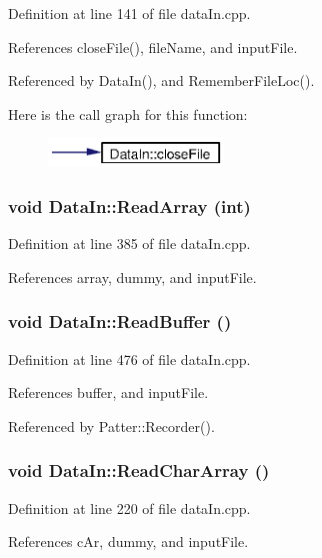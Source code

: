 Definition at line 141 of file data\-In.cpp.

References close\-File(), file\-Name, and input\-File.

Referenced by Data\-In(), and Remember\-File\-Loc().

Here is the call graph for this function:\begin{figure}[H]
\begin{center}
\leavevmode
\includegraphics[width=132pt]{classDataIn_a18_cgraph}
\end{center}
\end{figure}
\subsubsection{\setlength{\rightskip}{0pt plus 5cm}void Data\-In::Read\-Array (int)}\label{classDataIn_a15}




Definition at line 385 of file data\-In.cpp.

References array, dummy, and input\-File.
\subsubsection{\setlength{\rightskip}{0pt plus 5cm}void Data\-In::Read\-Buffer ()}\label{classDataIn_a24}




Definition at line 476 of file data\-In.cpp.

References buffer, and input\-File.

Referenced by Patter::Recorder().
\subsubsection{\setlength{\rightskip}{0pt plus 5cm}void Data\-In::Read\-Char\-Array ()}\label{classDataIn_a7}




Definition at line 220 of file data\-In.cpp.

References c\-Ar, dummy, and input\-File.
